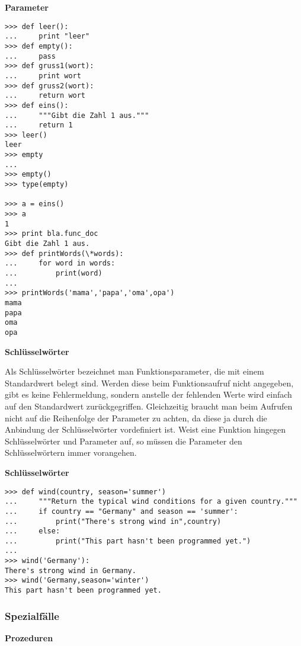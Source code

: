 \par\noindent\textbf{Parameter}

\begin{verbatim}
>>> def leer():
...     print "leer"
>>> def empty():
...     pass
>>> def gruss1(wort):
...     print wort
>>> def gruss2(wort):
...     return wort
>>> def eins():
...     """Gibt die Zahl 1 aus."""
...     return 1
>>> leer()
leer
>>> empty
... 
>>> empty()
>>> type(empty)

>>> a = eins()
>>> a
1
>>> print bla.func_doc
Gibt die Zahl 1 aus.
>>> def printWords(\*words):
...     for word in words:
...         print(word)
...
>>> printWords('mama','papa','oma',opa')
mama
papa
oma
opa
\end{verbatim}




\par\noindent\textbf{Schlüsselwörter}

Als Schlüsselwörter bezeichnet man Funktionsparameter, die mit einem
Standardwert belegt sind. Werden diese beim Funktionsaufruf nicht
angegeben, gibt es keine Fehlermeldung, sondern anstelle der fehlenden
Werte wird einfach auf den Standardwert zurückgegriffen. Gleichzeitig
braucht man beim Aufrufen nicht auf die Reihenfolge der Parameter zu
achten, da diese ja durch die Anbindung der Schlüsselwörter vordefiniert
ist. Weist eine Funktion hingegen Schlüsselwörter und Parameter auf, so
müssen die Parameter den Schlüsselwörtern immer vorangehen.




\par\noindent\textbf{Schlüsselwörter}

\begin{verbatim}
>>> def wind(country, season='summer')
...     """Return the typical wind conditions for a given country."""
...     if country == "Germany" and season == 'summer':
...         print("There's strong wind in",country)
...     else:
...         print("This part hasn't been programmed yet.")
...
>>> wind('Germany'):
There's strong wind in Germany.
>>> wind('Germany,season='winter')
This part hasn't been programmed yet.
\end{verbatim}



\subsubsection{\texorpdfstring{{Spezialfälle}}{Spezialfälle}}

\par\noindent\textbf{Prozeduren}

